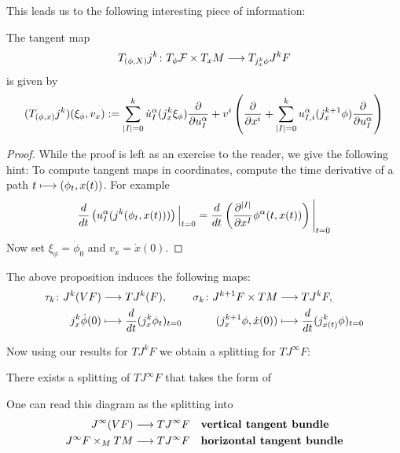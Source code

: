 This leads us to the following interesting piece of information:

\begin{prop}
  The tangent map
  $$ T_{(\phi,X)}j^k \colon T_\phi \FF \times T_x M \lra T_{j^k_x \phi} J^k F $$
  is given by
  $$ (T_{(\phi, x)} j^k)(\xi_\phi, v_x) := \sum_{|I|=0}^k \dot u^\alpha_I (j^k_x \xi_\phi) \dell{}{u^\alpha_I} + v^i \left( \dell{}{x^i} + \sum_{|I|=0}^k u^\alpha_{I,i} (j^{k+1}_x \phi) \dell{}{u^\alpha_I} \right) $$
\begin{proof}
  While the proof is left as an exercise to the reader, we give the following hint: To compute tangent maps in coordinates, compute the time derivative of a path $t \lmap (\phi_t, x(t))$. For example
  $$ \dd{}{t}\left( u^\alpha_I (j^k(\phi_t, x(t))) \right)\Big|_{t=0} = \dd{}{t}\left( \dell{^{|I|}}{x^I} \phi^\alpha(t, x(t)) \right)\Bigg|_{t=0} $$
  Now set $\xi_\phi = \dot \phi_0$ and $v_x = \dot x(0)$.
\end{proof}
\end{prop}

\begin{rem}
  The above proposition induces the following maps:
  \begin{align}
    \tau_k \colon J^k(VF) &\lra TJ^k(F), & \sigma_k \colon J^{k+1}F \times TM &\lra TJ^k F,\\
    j^k_x \dot\phi(0) &\lmap \dd{}{t}(j^k_x\phi_t)_{t=0} & (j^{k+1}_x \phi, \dot x(0)) &\lmap \dd{}{t}( j^k_{x(t)} \phi)_{t=0}
  \end{align}
\end{rem}

Now using our results for $TJ^kF$ we obtain a splitting for $TJ^\infty F$:

\begin{theo}
  There exists a splitting of $TJ^\infty F$ that takes the form of
  \begin{center}
  \end{center}
  One can read this diagram as the splitting into
  \begin{align}
    J^\infty(VF) & \longrightarrow TJ^\infty F \quad \textbf{vertical tangent bundle}\\
    J^\infty F \times_M TM & \longrightarrow TJ^\infty F \quad \textbf{horizontal tangent bundle}
  \end{align}
\end{theo}


